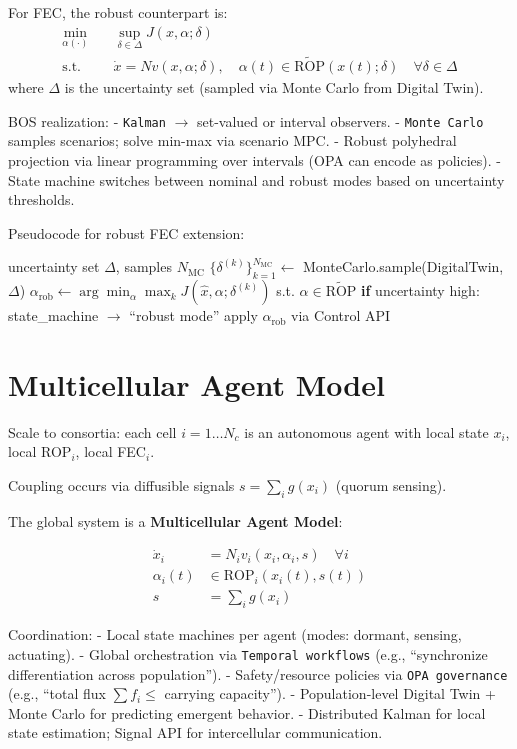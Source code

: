 \documentclass[11pt,a4paper]{article}
\begin{document}
For FEC, the robust counterpart is:
\begin{align}
\min_{\alpha(\cdot)} \quad & \sup_{\delta \in \Delta} J(x, \alpha; \delta) \\
\text{s.t.} \quad & \dot{x} = N v(x, \alpha; \delta), \quad \alpha(t) \in \widetilde{\text{ROP}}(x(t); \delta) \quad \forall \delta \in \Delta
\end{align}
where \(\Delta\) is the uncertainty set (sampled via Monte Carlo from Digital Twin).

BOS realization:
- \texttt{Kalman} \(\to\) set-valued or interval observers.
- \texttt{Monte Carlo} samples scenarios; solve min-max via scenario MPC.
- Robust polyhedral projection via linear programming over intervals (OPA can encode as policies).
- State machine switches between nominal and robust modes based on uncertainty thresholds.

Pseudocode for robust FEC extension:

\begin{algorithmic}[1]
\REQUIRE uncertainty set \(\Delta\), samples \(N_{\text{MC}}\)
\STATE \(\{\delta^{(k)}\}_{k=1}^{N_{\text{MC}}} \leftarrow\) MonteCarlo.sample(DigitalTwin, \(\Delta\))
\STATE \(\alpha_{\text{rob}} \leftarrow \arg\min_{\alpha} \max_k J(\hat{x}, \alpha; \delta^{(k)})\) s.t. \(\alpha \in \widetilde{\text{ROP}}\)
\STATE \textbf{if} uncertainty high: state\_machine \(\to\) ``robust mode''
\STATE apply \(\alpha_{\text{rob}}\) via Control API
\end{algorithmic}

\section{Multicellular Agent Model}

Scale to consortia: each cell \(i = 1 \dots N_c\) is an autonomous agent with local state \(x_i\), local ROP\(_i\), local FEC\(_i\).

Coupling occurs via diffusible signals \(s = \sum_i g(x_i)\) (quorum sensing).

The global system is a \textbf{Multicellular Agent Model}:

\begin{align}
\dot{x}_i &= N_i v_i(x_i, \alpha_i, s) \quad \forall i \\
\alpha_i(t) &\in \text{ROP}_i(x_i(t), s(t)) \\
s &= \sum_i g(x_i)
\end{align}

Coordination:
- Local state machines per agent (modes: dormant, sensing, actuating).
- Global orchestration via \texttt{Temporal workflows} (e.g., ``synchronize differentiation across population'').
- Safety/resource policies via \texttt{OPA governance} (e.g., ``total flux \(\sum f_i \leq\) carrying capacity'').
- Population-level Digital Twin + Monte Carlo for predicting emergent behavior.
- Distributed Kalman for local state estimation; Signal API for intercellular communication.
\end{document}
